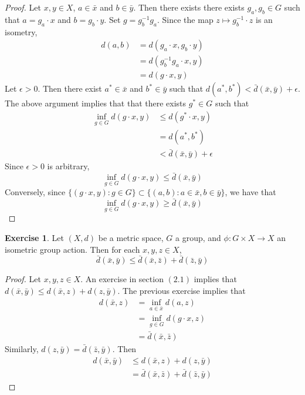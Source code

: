 \documentclass[12pt]{amsart}
\theoremstyle{definition}
\newtheorem{ex}[definition]{Exercise}
\newcommand{\ep}{\epsilon}
\DeclareMathOperator*{\0}{\mbf{0}}
\DeclareMathOperator*{\1}{\mbf{1}}
\newcommand{\lex}[1]{\label{ex:#1}}
\begin{document}
	\begin{proof}
	Let $x, y \in X$, $a \in \bar{x}$ and $b \in \bar{y}$. Then there exists there exists $g_a, g_b \in G$ such that $a = g_a \cdot x$ and $b = g_b \cdot y$. Set $g = g_b^{-1}g_a$. Since the map $z \mapsto g_b^{-1} \cdot z$ is an isometry, 
	\begin{align*}
	d(a,b) 
	&= d(g_a \cdot x, g_b \cdot y) \\
	&= d(g_b^{-1}g_a \cdot x, y)\\
	&= d(g\cdot x, y)
	\end{align*}
	Let $\ep >0$. Then there exist $a^* \in \bar{x}$ and $b^* \in \bar{y}$ such that $d(a^*,b^*) < \bar{d}(\bar{x},\bar{y}) + \ep$. The above argument implies that that there exists $g^* \in G$ such that 
	\begin{align*} 
	\inf_{g \in G} d(g \cdot x, y) 
	& \leq d(g^* \cdot x, y) \\
	&= d(a^*, b^*) \\
	& < \bar{d}(\bar{x}, \bar{y}) + \ep
\end{align*}	 
	Since $\ep >0$ is arbitrary, $$\inf_{g \in G} d(g \cdot x, y) \leq \bar{d}(\bar{x}, \bar{y})$$
	Conversely, since $\{(g \cdot x, y): g \in G\} \subset \{(a,b): a \in \bar{x}, b \in \bar{y}\}$, we have that 
	$$\inf_{g \in G} d(g \cdot x, y) \geq \bar{d}(\bar{x}, \bar{y})$$ 
	\end{proof}
	
	\begin{ex} \lex{}
	Let $(X, d)$ be a metric space, $G$ a group, and $\phi: G \times X \rightarrow X$ an isometric group action. Then for each $x, y, z \in X$, $$\bar{d}(\bar{x}, \bar{y}) \leq \bar{d}(\bar{x}, \bar{z}) + \bar{d}(\bar{z}, \bar{y})$$
	\end{ex}
	
	\begin{proof}
	Let $x, y, z \in X$. An exercise in section $(2.1)$ implies that $d(\bar{x}, \bar{y}) \leq d(\bar{x}, z) + d(z, \bar{y})$. The previous exercise implies that 
	\begin{align*}
	d(\bar{x}, z) 
	&= \inf_{a \in \bar{x}} d(a, z) \\
	&= \inf_{g \in G} d(g \cdot x, z) \\
	&= \bar{d}(\bar{x}, \bar{z})
	\end{align*}
	Similarly, $d(z, \bar{y}) = \bar{d}(\bar{z}, \bar{y})$. Then 
	\begin{align*}
	d(\bar{x}, \bar{y}) 
	&\leq d(\bar{x}, z) + d(z, \bar{y}) \\
	&= \bar{d}(\bar{x}, \bar{z}) + \bar{d}(\bar{z}, \bar{y})
	\end{align*}
	\end{proof}
	
\end{document}
